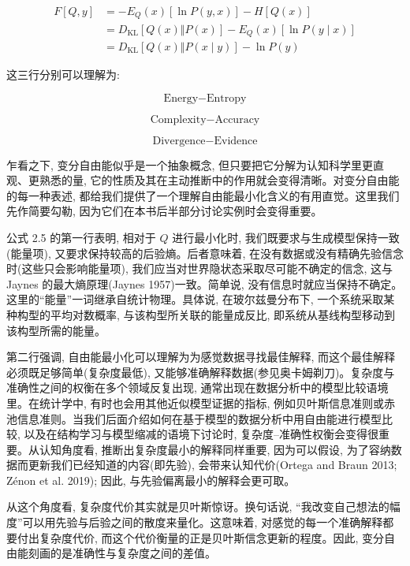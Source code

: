 \begin{equation}
\begin{aligned}
F[Q, y]
&= -E_Q(x)[\ln P(y, x)] - H[Q(x)] \\
&= D_{\mathrm{KL}}[Q(x)\Vert P(x)] - E_Q(x)[\ln P(y \mid x)] \\
&= D_{\mathrm{KL}}[Q(x)\Vert P(x \mid y)] - \ln P(y)
\end{aligned}
\tag{2.5}
\end{equation}

这三行分别可以理解为:

\[
\text{Energy} - \text{Entropy}
\]

\[
\text{Complexity} - \text{Accuracy}
\]

\[
\text{Divergence} - \text{Evidence}
\]

乍看之下, 变分自由能似乎是一个抽象概念, 但只要把它分解为认知科学里更直观、更熟悉的量, 它的性质及其在主动推断中的作用就会变得清晰。对变分自由能的每一种表述, 都给我们提供了一个理解自由能最小化含义的有用直觉。这里我们先作简要勾勒, 因为它们在本书后半部分讨论实例时会变得重要。

公式 2.5 的第一行表明, 相对于 $Q$ 进行最小化时, 我们既要求与生成模型保持一致(能量项), 又要求保持较高的后验熵。后者意味着, 在没有数据或没有精确先验信念时(这些只会影响能量项), 我们应当对世界隐状态采取尽可能不确定的信念, 这与 Jaynes 的最大熵原理(Jaynes 1957)一致。简单说, 没有信息时就应当保持不确定。这里的``能量''一词继承自统计物理。具体说, 在玻尔兹曼分布下, 一个系统采取某种构型的平均对数概率, 与该构型所关联的能量成反比, 即系统从基线构型移动到该构型所需的能量。

第二行强调, 自由能最小化可以理解为为感觉数据寻找最佳解释, 而这个最佳解释必须既足够简单(复杂度最低), 又能够准确解释数据(参见奥卡姆剃刀)。复杂度与准确性之间的权衡在多个领域反复出现, 通常出现在数据分析中的模型比较语境里。在统计学中, 有时也会用其他近似模型证据的指标, 例如贝叶斯信息准则或赤池信息准则。当我们后面介绍如何在基于模型的数据分析中用自由能进行模型比较, 以及在结构学习与模型缩减的语境下讨论时, 复杂度--准确性权衡会变得很重要。从认知角度看, 推断出复杂度最小的解释同样重要, 因为可以假设, 为了容纳数据而更新我们已经知道的内容(即先验), 会带来认知代价(Ortega and Braun 2013; Z\'enon et al. 2019); 因此, 与先验偏离最小的解释会更可取。

从这个角度看, 复杂度代价其实就是贝叶斯惊讶。换句话说, ``我改变自己想法的幅度''可以用先验与后验之间的散度来量化。这意味着, 对感觉的每一个准确解释都要付出复杂度代价, 而这个代价衡量的正是贝叶斯信念更新的程度。因此, 变分自由能刻画的是准确性与复杂度之间的差值。

